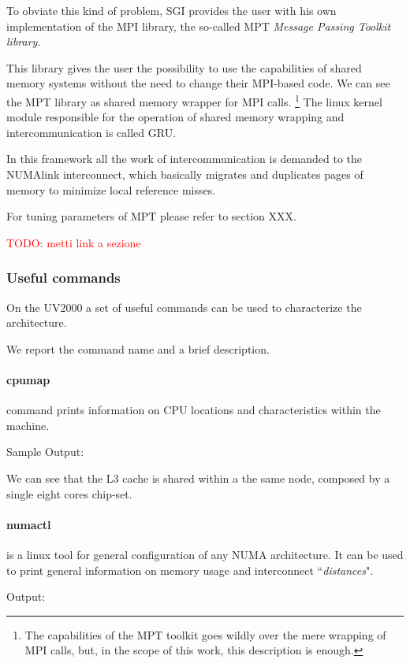 \documentclass[a4paper,12pt]{article}
\newcommand\mynotes[1]{\begin{flushright}

\textcolor{red}{TODO: #1}\end{flushright}}
\begin{document}
To obviate this kind of problem, SGI provides the user with his own implementation of the MPI library, the so-called MPT\cite{MPT} \textit{Message Passing Toolkit library}.

This library gives the user the possibility to use the capabilities of shared memory systems without the need to change their MPI-based code. 
We can see the MPT library as shared memory wrapper for MPI calls. \footnote{The capabilities of the MPT toolkit goes wildly over the mere wrapping of MPI calls, but, in the scope of this work, this description is enough.}
The linux kernel module responsible for the operation of shared memory wrapping and intercommunication is called GRU.

In this framework all the work of intercommunication is demanded to the NUMAlink interconnect, which basically migrates and duplicates pages of memory to minimize local reference misses.

For tuning parameters of MPT please refer to section XXX.
\mynotes{metti link a sezione}

\subsubsection{Useful commands}
On the UV2000 a set of useful commands can be used to characterize the architecture.

We report the command name and a brief description.

\paragraph{cpumap} command prints information on CPU locations and characteristics within the machine.

Sample Output: 


We can see that the L3 cache is shared within a the same node, composed by a single eight cores chip-set.


\paragraph{numactl} is a linux tool for general configuration of any NUMA architecture.
It can be used to print general information on memory usage and interconnect ``\textit{distances}".

Output:


\end{document}
